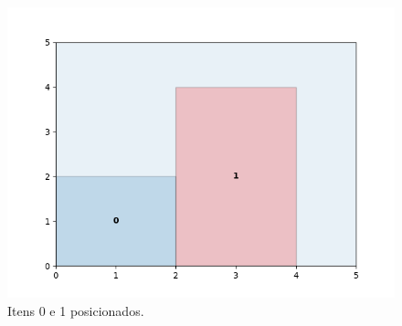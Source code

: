 \begin{figure}[H]
    \centering
    \includegraphics[scale=0.5]{utils/images/continuous_example}
    \caption{Itens 0 e 1 posicionados.}
    \label{fig:sobreposicao-dominio}
\end{figure}
